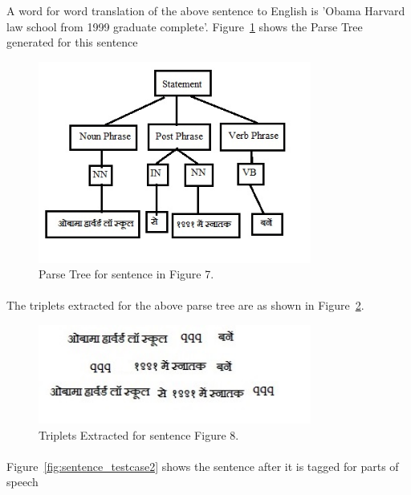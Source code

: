 A word for word translation of the above sentence to English is 'Obama Harvard law school from 1999 graduate complete'. Figure~\ref{fig:standalone_testcase} shows the Parse Tree generated for this sentence 

\begin{figure}[htb]
\centering
\includegraphics[width=0.8\textwidth]{images/standalone_testcase.jpg}
\caption{Parse Tree for sentence in Figure 7.} 
\label{fig:standalone_testcase}
\end{figure}

\paragraph{}
The triplets extracted for the above parse tree are as shown in Figure~\ref{fig:triplet_standalone}.

\begin{figure}[htb]
\centering
\includegraphics[width=0.8\textwidth]{images/triplet_standalone.jpg}
\caption{Triplets Extracted for sentence Figure 8.} 
\label{fig:triplet_standalone}
\end{figure}

\break
\paragraph{}
Figure~\ref{fig:sentence_testcase2} shows the sentence after it is tagged for parts of speech

